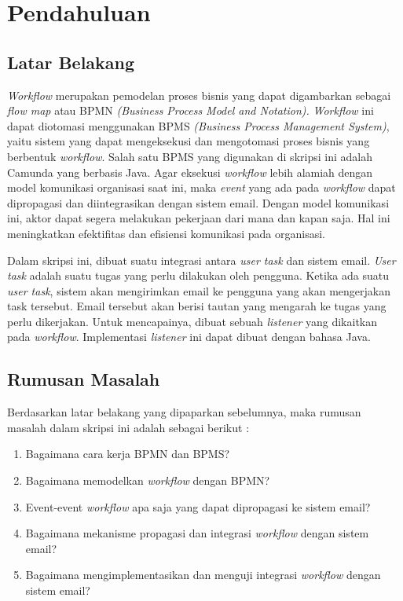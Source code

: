 \chapter{Pendahuluan}
\label{chap:intro}
   
\section{Latar Belakang}
\label{sec:label}

\textit{Workflow} merupakan pemodelan proses bisnis yang dapat digambarkan sebagai \textit{flow map} atau BPMN \textit{(Business Process Model and Notation).} \textit{Workflow} ini dapat diotomasi menggunakan BPMS \textit{(Business Process Management System)}, yaitu sistem yang dapat mengeksekusi dan mengotomasi proses bisnis yang berbentuk \textit{workflow}. Salah satu BPMS yang digunakan di skripsi ini adalah Camunda yang berbasis Java. Agar eksekusi \textit{workflow} lebih alamiah dengan model komunikasi organisasi saat ini, maka \textit{event} yang ada pada \textit{workflow} dapat dipropagasi dan diintegrasikan dengan sistem email. Dengan model komunikasi ini, aktor dapat segera melakukan pekerjaan dari mana dan kapan saja. Hal ini meningkatkan efektifitas dan efisiensi komunikasi pada organisasi. 

Dalam skripsi ini, dibuat suatu integrasi antara \textit{user task} dan sistem email. \textit{User task} adalah suatu tugas yang perlu dilakukan oleh pengguna. Ketika ada suatu \textit{user task}, sistem akan mengirimkan email ke pengguna yang akan mengerjakan task tersebut. Email tersebut akan berisi tautan yang mengarah ke tugas yang perlu dikerjakan. Untuk mencapainya, dibuat sebuah \textit{listener} yang dikaitkan pada \textit{workflow}. Implementasi \textit{listener} ini dapat dibuat dengan bahasa Java. 



\section{Rumusan Masalah}
\label{sec:rumusan}

Berdasarkan latar belakang yang dipaparkan sebelumnya, maka rumusan masalah dalam skripsi ini adalah sebagai berikut :
\begin{enumerate}
	\item Bagaimana cara kerja BPMN dan BPMS?
	\item Bagaimana memodelkan \textit{workflow} dengan BPMN?
	\item Event-event \textit{workflow} apa saja yang dapat dipropagasi ke sistem email?
	\item Bagaimana mekanisme propagasi dan integrasi \textit{workflow} dengan sistem email?
	\item Bagaimana mengimplementasikan dan menguji integrasi \textit{workflow} dengan sistem email?
\end{enumerate} 




